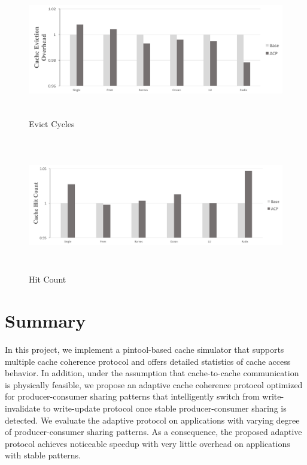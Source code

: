 \documentclass[11pt,conference]{IEEEtran}
\begin{document}
\begin{figure}[!h]
\centering
\captionsetup{justification=centering}
\includegraphics[width=7.5in,height=2.3in]{evict_cycles.png}
\caption{Evict Cycles}
\label{evict_cycles}
\end{figure}
\FloatBarrier

\begin{figure}[!h]
\centering
\captionsetup{justification=centering}
\includegraphics[width=7.5in,height=2.3in]{hit_count.png}
\caption{Hit Count}
\label{hit_count}
\end{figure}
\FloatBarrier


\newpage
\null\newpage

\section{Summary}
In this project, we implement a pintool-based cache simulator that supports multiple cache coherence protocol and offers detailed statistics of cache access behavior. In addition, under the assumption that cache-to-cache communication is physically feasible, we propose an adaptive cache coherence protocol optimized for producer-consumer sharing patterns that intelligently switch from write-invalidate to write-update protocol once stable producer-consumer sharing is detected. We evaluate the adaptive protocol on applications with varying degree of producer-consumer sharing patterns. As a consequence, the proposed adaptive protocol achieves noticeable speedup with very little overhead on applications with stable patterns.
\end{document}
